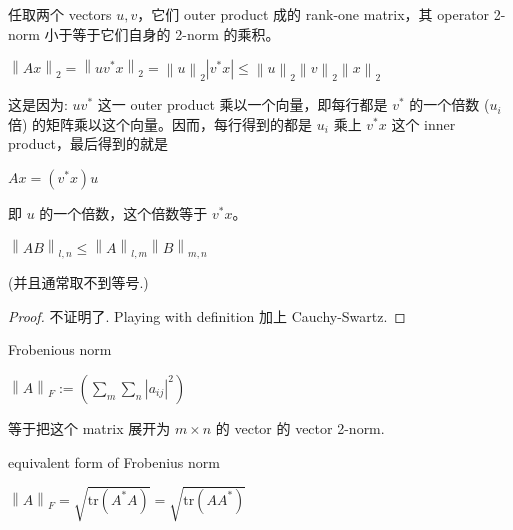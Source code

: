 \begin{example}

任取两个 vectors \(u,v\)，它们 outer product 成的 rank-one matrix，其 operator 2-norm 小于等于它们自身的 2-norm 的乘积。

\(\left\| {Ax} \right\|_{2} = \left\| {uv^{\ast}x} \right\|_{2} = \left\| u \right\|_{2}\left| {v^{\ast}x} \right| \leq \left\| u \right\|_{2}\left\| v \right\|_{2}\left\| x \right\|_{2}\)

这是因为: \(uv^{\ast}\) 这一 outer product 乘以一个向量，即每行都是 \(v^{\ast}\) 的一个倍数 (\(u_{i}\) 倍) 的矩阵乘以这个向量。因而，每行得到的都是 \(u_{i}\) 乘上 \(v^{\ast}x\) 这个 inner product，最后得到的就是

\(Ax = \left( {v^{\ast}x} \right)u\)

即 \(u\) 的一个倍数，这个倍数等于 \(v^{\ast}x\)。

\end{example}

\begin{example}

\begin{theorem}

\(\left\| {AB} \right\|_{l,n} \leq \left\| A \right\|_{l,m}\left\| B \right\|_{m,n}\)

\end{theorem}

(并且通常取不到等号.)

\begin{proof}

不证明了. Playing with definition 加上 Cauchy-Swartz.

\end{proof}

\end{example}

\begin{definition}{Frobenious norm}

\(\left\| A \right\|_{F} := \left( {\sum_{m}\sum_{n}\left| a_{ij} \right|^{2}} \right)\)

等于把这个 matrix 展开为 \(m \times n\) 的 vector 的 vector 2-norm.

\end{definition}

\begin{theorem}{equivalent form of Frobenius norm}

\(\left\| A \right\|_{F} = \sqrt{\text{tr}\left( {A^{\ast}A} \right)} = \sqrt{\text{tr}\left( {AA^{\ast}} \right)}\)

\end{theorem}

